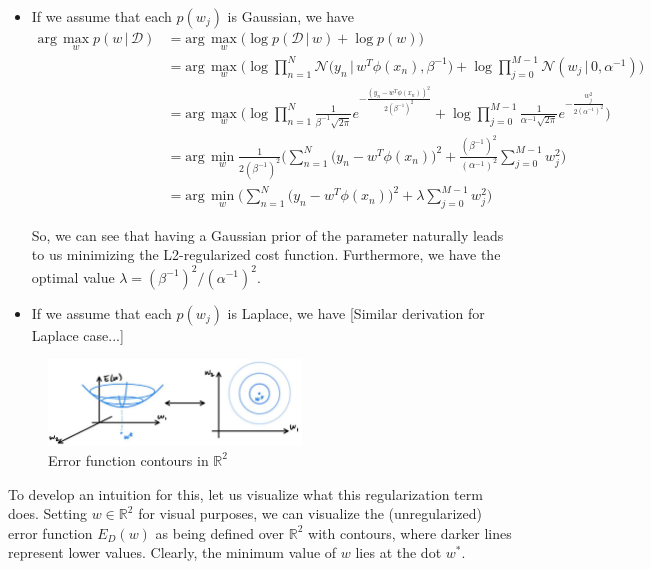 \documentclass{article}
\begin{document}
    \begin{itemize}
      \item If we assume that each $p(w_j)$ is Gaussian, we have
      \begin{align*}
        \text{arg}\, \max_w p(w\,|\,\mathcal{D}) & = \text{arg}\, \max_w \Big( \log{p(\mathcal{D}\,|\,w)} + \log{p(w)} \Big) \\
        & = \text{arg}\, \max_w \Bigg( \log \prod_{n=1}^N \mathcal{N}\big(y_n \,|\, w^T \phi(x_n), \beta^{-1} \big) + \log \prod_{j=0}^{M-1} \mathcal{N}(w_j \,|\,0, \alpha^{-1}) \Bigg) \\
        & = \text{arg}\, \max_w \Bigg( \log \prod_{n=1}^N \frac{1}{\beta^{-1} \sqrt{2 \pi}} e^{-\frac{(y_n - w^T \phi(x_n))^2}{2 (\beta^{-1})^2}} + \log \prod_{j=0}^{M-1} \frac{1}{\alpha^{-1} \sqrt{2 \pi}} e^{-\frac{w_j^2}{2 (\alpha^{-1})^2}}\Bigg) \\
        & = \text{arg}\, \min_w \frac{1}{2 (\beta^{-1})^2} \bigg( \sum_{n=1}^N \big( y_n - w^T \phi(x_n)\big)^2 + \frac{(\beta^{-1})^2}{(\alpha^{-1})^2} \sum_{j=0}^{M-1} w_j^2 \bigg) \\
        & = \text{arg}\, \min_w \bigg( \sum_{n=1}^N \big( y_n - w^T \phi(x_n)\big)^2 + \lambda \sum_{j=0}^{M-1} w_j^2 \bigg)
      \end{align*}
      
      So, we can see that having a Gaussian prior of the parameter naturally leads to us minimizing the L2-regularized cost function. Furthermore, we have the optimal value $\lambda = (\beta^{-1})^2/(\alpha^{-1})^2$.

      \item If we assume that each $p(w_j)$ is Laplace, we have
      [Similar derivation for Laplace case...]
    \end{itemize}

    \begin{figure}[H]
      \centering
      \includegraphics[width=0.6\textwidth]{img/ED(W).jpg}
      \caption{Error function contours in $\mathbb{R}^2$}
    \end{figure}

    To develop an intuition for this, let us visualize what this regularization term does. Setting $w \in \mathbb{R}^2$ for visual purposes, we can visualize the (unregularized) error function $E_D (w)$ as being defined over $\mathbb{R}^2$ with contours, where darker lines represent lower values. Clearly, the minimum value of $w$ lies at the dot $w^*$.
\end{document}
